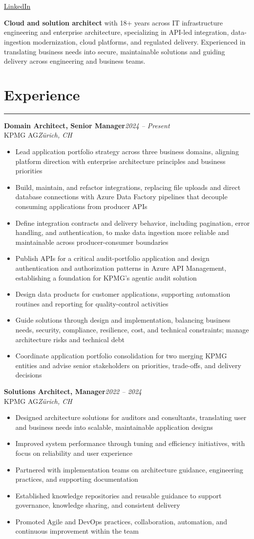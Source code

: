 \documentclass[10pt,a4paper]{article}
\newcommand{\contactheader}{%
  \begin{center}
    {\fontsize{24}{28}\selectfont\bfseries \personNameUpper\\[0.35em]}
    {\large
      \faPhone\ \personPhone\ \hspace{0.5em} \textbullet\ \hspace{0.5em} \personAddress\\
      \href{mailto:\personEmail}{\personEmail} \hspace{0.5em}\textbullet\hspace{0.5em}
      \href{\personLinkedIn}{LinkedIn}
    }
  \end{center}
  \vspace{0.2em}
}
\newcommand{\sectionrule}{\noindent\rule{\linewidth}{0.4pt}\par\vspace{0.24em}}
\newcommand{\jobseparator}{\vspace{0.45em}}
\newcommand{\job}[5]{%
  {\textbf{#1}}\hfill{\textit{#2}}\\
  {#3}\hfill{\textit{#4}}\\
  \begin{itemize}
    #5
  \end{itemize}
}
\begin{document}
\contactheader

\noindent\textbf{Cloud and solution architect} with 18+ years across IT infrastructure engineering and enterprise architecture, specializing in API-led integration, data-ingestion modernization, cloud platforms, and regulated delivery. Experienced in translating business needs into secure, maintainable solutions and guiding delivery across engineering and business teams.

\section*{Experience}
\sectionrule

\job{Domain Architect, Senior Manager}{2024 -- Present}{KPMG AG}{Zürich, CH}{
  \item Lead application portfolio strategy across three business domains, aligning platform direction with enterprise architecture principles and business priorities
  \item Build, maintain, and refactor integrations, replacing file uploads and direct database connections with Azure Data Factory pipelines that decouple consuming applications from producer APIs
  \item Define integration contracts and delivery behavior, including pagination, error handling, and authentication, to make data ingestion more reliable and maintainable across producer-consumer boundaries
  \item Publish APIs for a critical audit-portfolio application and design authentication and authorization patterns in Azure API Management, establishing a foundation for KPMG's agentic audit solution
  \item Design data products for customer applications, supporting automation routines and reporting for quality-control activities
  \item Guide solutions through design and implementation, balancing business needs, security, compliance, resilience, cost, and technical constraints; manage architecture risks and technical debt
  \item Coordinate application portfolio consolidation for two merging KPMG entities and advise senior stakeholders on priorities, trade-offs, and delivery decisions
}
\jobseparator

\job{Solutions Architect, Manager}{2022 -- 2024}{KPMG AG}{Zürich, CH}{
  \item Designed architecture solutions for auditors and consultants, translating user and business needs into scalable, maintainable application designs
  \item Improved system performance through tuning and efficiency initiatives, with focus on reliability and user experience
  \item Partnered with implementation teams on architecture guidance, engineering practices, and supporting documentation
  \item Established knowledge repositories and reusable guidance to support governance, knowledge sharing, and consistent delivery
  \item Promoted Agile and DevOps practices, collaboration, automation, and continuous improvement within the team
}
\jobseparator
\end{document}
